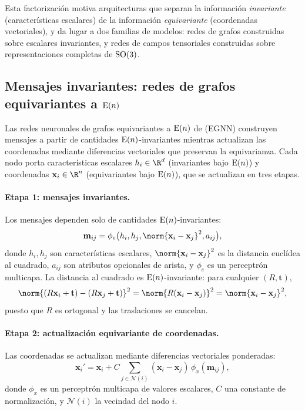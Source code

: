 Esta factorizaci\'on motiva arquitecturas que separan la informaci\'on
\emph{invariante} (caracter\'isticas escalares) de la informaci\'on
\emph{equivariante} (coordenadas vectoriales), y da lugar a dos familias de
modelos: redes de grafos construidas sobre escalares invariantes, y redes de
campos tensoriales construidas sobre representaciones completas de $\operatorname{SO}(3)$.

\subsection{Mensajes invariantes: redes de grafos equivariantes a \texorpdfstring{$\operatorname{E}(n)$}{E(n)}}
\label{sec:groups:egnn}

Las redes neuronales de grafos equivariantes a $\operatorname{E}(n)$ de
\citet{satorras2021enequivariant} (EGNN) construyen mensajes a partir de
cantidades $\operatorname{E}(n)$-invariantes mientras actualizan las coordenadas mediante
diferencias vectoriales que preservan la equivarianza. Cada nodo porta
caracter\'isticas escalares $h_i \in \R^d$ (invariantes bajo $\operatorname{E}(n)$) y
coordenadas $\mathbf{x}_i \in \R^n$ (equivariantes bajo $\operatorname{E}(n)$), que se
actualizan en tres etapas.

\paragraph{Etapa 1: mensajes invariantes.}
Los mensajes dependen solo de cantidades $\operatorname{E}(n)$-invariantes:
\begin{equation}
  \mathbf{m}_{ij} = \phi_e\big(h_i, h_j, \norm{\mathbf{x}_i - \mathbf{x}_j}^2,
    a_{ij}\big),
  \label{eq:groups:egnn-message}
\end{equation}
donde $h_i, h_j$ son caracter\'isticas escalares, $\norm{\mathbf{x}_i -
\mathbf{x}_j}^2$ es la distancia eucl\'idea al cuadrado, $a_{ij}$ son atributos
opcionales de arista, y $\phi_e$ es un perceptr\'on multicapa. La distancia al
cuadrado es $\operatorname{E}(n)$-invariante: para cualquier $(R, \mathbf{t})$,
\begin{equation}
  \norm{(R\mathbf{x}_i + \mathbf{t}) - (R\mathbf{x}_j + \mathbf{t})}^2
  = \norm{R(\mathbf{x}_i - \mathbf{x}_j)}^2
  = \norm{\mathbf{x}_i - \mathbf{x}_j}^2,
\end{equation}
puesto que $R$ es ortogonal y las traslaciones se cancelan.

\paragraph{Etapa 2: actualizaci\'on equivariante de coordenadas.}
Las coordenadas se actualizan mediante diferencias vectoriales ponderadas:
\begin{equation}
  \mathbf{x}_i' = \mathbf{x}_i + C \sum_{j \in \mathcal{N}(i)}
    (\mathbf{x}_i - \mathbf{x}_j)\, \phi_x(\mathbf{m}_{ij}),
  \label{eq:groups:egnn-coord}
\end{equation}
donde $\phi_x$ es un perceptr\'on multicapa de valores escalares, $C$ una
constante de normalizaci\'on, y $\mathcal{N}(i)$ la vecindad del nodo $i$.

